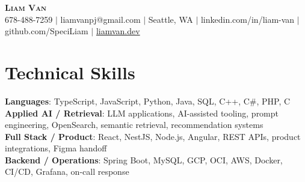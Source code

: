 \documentclass[letterpaper,11pt]{article}
\begin{document}

%
\begin{center}
    \textbf{\Huge \scshape Liam Van} \\ \vspace{1pt}
    \small 678-488-7259 $|$ \small {liamvanpj@gmail.com} $|$ Seattle, WA
 {{$|$ linkedin.com/in/liam-van} {$|$ github.com/SpeciLiam} {$|$ \href{https://liamvan.dev}{liamvan.dev}}}

\end{center}

\section{Technical Skills}
 \begin{itemize}[leftmargin=0.15in, label={}]
    \small{\item{
     \textbf{Languages}{: TypeScript, JavaScript, Python, Java, SQL, C++, C\#, PHP, C} \\
     \textbf{Applied AI / Retrieval}{: LLM applications, AI-assisted tooling, prompt engineering, OpenSearch, semantic retrieval, recommendation systems} \\
     \textbf{Full Stack / Product}{: React, NestJS, Node.js, Angular, REST APIs, product integrations, Figma handoff} \\
     \textbf{Backend / Operations}{: Spring Boot, MySQL, GCP, OCI, AWS, Docker, CI/CD, Grafana, on-call response} \\
    }}
 \end{itemize}
%
\end{document}
